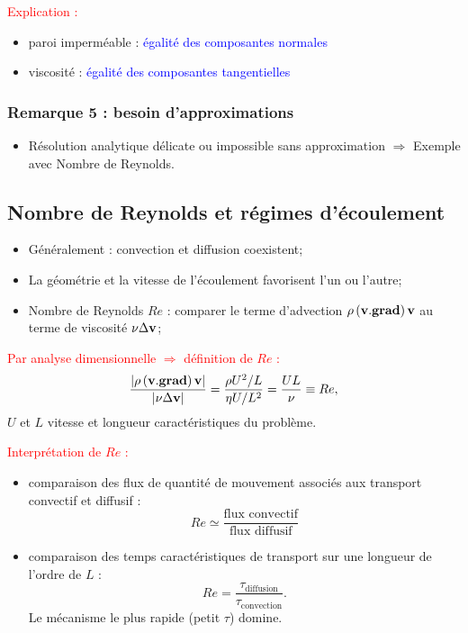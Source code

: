 \documentclass[11pt,a4paper]{report}
\begin{document}
\textcolor{red}{Explication :}
\begin{itemize}
	\item paroi imperméable : \textcolor{blue}{égalité des composantes normales} 
	\item viscosité : \textcolor{blue}{égalité des composantes tangentielles}
\end{itemize}

\subsubsection{Remarque 5 : besoin d'approximations}
\begin{itemize}
	\item Résolution analytique délicate ou impossible sans approximation $\Rightarrow$ Exemple avec Nombre de Reynolds.
\end{itemize}

\subsection{Nombre de Reynolds et régimes d'écoulement}\label{sec:2.2}

\begin{itemize}
	\item Généralement : convection et diffusion coexistent;
	\item La géométrie et la vitesse de l'écoulement favorisent l'un ou l'autre;
	\item Nombre de Reynolds $Re$ : comparer le terme d'advection $\rho\left(\bold{v}.\textbf{\text{grad}}\right)\bold{v}$ au terme de viscosité $\nu\Delta\bold{v}$;
\end{itemize} 

\textcolor{red}{Par analyse dimensionnelle $\Rightarrow$ définition de $Re$ :}
\begin{equation}
	\frac{|\rho\left(\bold{v}.\textbf{\text{grad}}\right)\bold{v}|}{|\nu\Delta\bold{v}|} = \frac{\rho U^2/L}{\eta U/L^2} = \frac{UL}{\nu} \equiv Re,
\end{equation}
$U$ et $L$ vitesse et longueur caractéristiques du problème.

\textcolor{red}{Interprétation de $Re$ :}
\begin{itemize}
\item comparaison des flux de quantité de mouvement associés aux transport convectif et diffusif :
	\begin{equation}
		Re \simeq \frac{\text{flux convectif}}{\text{flux diffusif}}
	\end{equation}
\item comparaison des temps caractéristiques de transport sur une longueur de l'ordre de $L$ :
	\begin{equation}
		Re = \frac{\tau_\text{diffusion}}{\tau_\text{convection}}.
	\end{equation}
	Le mécanisme le plus rapide (petit $\tau$) domine.
\end{itemize}
\end{document}
